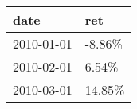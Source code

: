 \begin{tabular}{ll}
\toprule
      date &     ret \\
\midrule
2010-01-01 &  -8.86\% \\
2010-02-01 &   6.54\% \\
2010-03-01 &  14.85\% \\
\bottomrule
\end{tabular}
